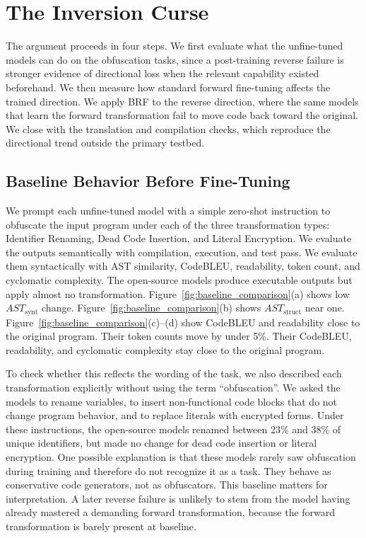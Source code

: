 \section{The Inversion Curse}
\label{sec:cognitive_specialization}

The argument proceeds in four steps. We first evaluate what the unfine-tuned
models can do on the obfuscation tasks, since a post-training reverse
failure is stronger evidence of directional loss when the relevant capability
existed beforehand. We then measure how standard forward fine-tuning affects the
trained direction. We apply BRF to the reverse direction, where the same models
that learn the forward transformation fail to move code back toward the original.
We close with the translation and compilation checks, which reproduce the
directional trend outside the primary testbed.


\subsection{Baseline Behavior Before Fine-Tuning}
\label{sec:baseline_experiment}

We prompt each unfine-tuned model with a simple zero-shot instruction to
obfuscate the input program under each of the three transformation types:
Identifier Renaming, Dead Code Insertion, and Literal Encryption. We evaluate
the outputs semantically with compilation, execution, and test pass. We evaluate
them syntactically with AST similarity, CodeBLEU, readability, token count, and
cyclomatic complexity.
The open-source models produce executable outputs but apply almost no
transformation. 
Figure~\ref{fig:baseline_comparison}(a) shows low
$AST_{\text{synt}}$ change. Figure~\ref{fig:baseline_comparison}(b) shows
$AST_{\text{struct}}$ near one. Figure~\ref{fig:baseline_comparison}(c)--(d)
show CodeBLEU and readability close to the original program.
Their token counts move by under 5\%. Their CodeBLEU, readability, and cyclomatic complexity
stay close to the original program. 

To check whether this reflects the wording of the task, we also described each transformation explicitly without using the term ``obfuscation''.
We asked the models to rename variables, to insert non-functional code blocks that do not change program behavior, and to replace literals with encrypted forms.
Under these instructions, the open-source models renamed between 23\% and 38\% of unique identifiers, but made no change for dead code insertion or literal encryption.
One possible explanation is that these models rarely saw obfuscation during training and therefore do not recognize it as a task. 
They behave as conservative code generators,
not as obfuscators. This baseline matters for interpretation. A later reverse
failure is unlikely to stem from the model having already mastered a demanding
forward transformation, because the forward transformation is barely present at
baseline.



